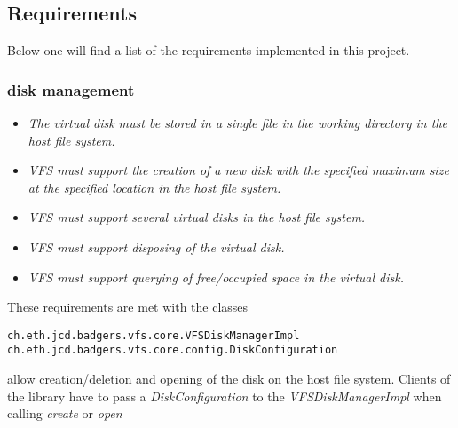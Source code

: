 \subsection{Requirements}
Below one will find a list of the requirements implemented in this project.

\subsubsection {disk management}
\begin{itemize}
  \item \emph{The virtual disk must be stored in a single file in the working
  directory in the host file system.}
  \item \emph{VFS must support the creation of a new disk with the specified
  maximum size at the specified location in the host file system. }
  \item \emph{VFS must support several virtual disks in the host file system.}
  \item \emph{VFS must support disposing of the virtual disk.}
  \item \emph{VFS must support querying of free/occupied space in the virtual
  disk.}
\end{itemize}  These requirements are met with the classes
\begin{verbatim}
ch.eth.jcd.badgers.vfs.core.VFSDiskManagerImpl
ch.eth.jcd.badgers.vfs.core.config.DiskConfiguration
\end{verbatim} allow creation/deletion and opening of the disk on the host
file system. Clients of the library have to pass a \textit{DiskConfiguration}
to the \textit{VFSDiskManagerImpl} when calling \textit{create} or
\textit{open}
